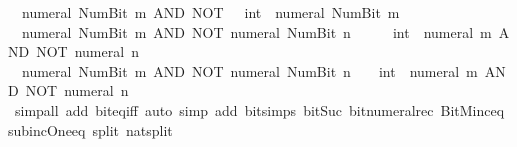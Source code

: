 \begin{isabellebody}
\ \ {\isacartoucheopen}numeral\ {\isacharparenleft}{\kern0pt}Num{\isachardot}{\kern0pt}Bit{}\ m{\isacharparenright}{\kern0pt}\ AND\ NOT\ {\isacharparenleft}{\kern0pt}{}\ {\isacharcolon}{\kern0pt}{\isacharcolon}{\kern0pt}\ int{\isacharparenright}{\kern0pt}\ {\isacharequal}{\kern0pt}\ numeral\ {\isacharparenleft}{\kern0pt}Num{\isachardot}{\kern0pt}Bit{}\ m{\isacharparenright}{\kern0pt}{\isacartoucheclose}\isanewline
\ \ {\isacartoucheopen}numeral\ {\isacharparenleft}{\kern0pt}Num{\isachardot}{\kern0pt}Bit{}\ m{\isacharparenright}{\kern0pt}\ AND\ NOT\ {\isacharparenleft}{\kern0pt}numeral\ {\isacharparenleft}{\kern0pt}Num{\isachardot}{\kern0pt}Bit{}\ n{\isacharparenright}{\kern0pt}{\isacharparenright}{\kern0pt}\ {\isacharequal}{\kern0pt}\ {}\ {\isacharplus}{\kern0pt}\ {\isacharparenleft}{\kern0pt}{}\ {\isacharcolon}{\kern0pt}{\isacharcolon}{\kern0pt}\ int{\isacharparenright}{\kern0pt}\ {\isacharasterisk}{\kern0pt}\ {\isacharparenleft}{\kern0pt}numeral\ m\ AND\ NOT\ {\isacharparenleft}{\kern0pt}numeral\ n{\isacharparenright}{\kern0pt}{\isacharparenright}{\kern0pt}{\isacartoucheclose}\isanewline
\ \ {\isacartoucheopen}numeral\ {\isacharparenleft}{\kern0pt}Num{\isachardot}{\kern0pt}Bit{}\ m{\isacharparenright}{\kern0pt}\ AND\ NOT\ {\isacharparenleft}{\kern0pt}numeral\ {\isacharparenleft}{\kern0pt}Num{\isachardot}{\kern0pt}Bit{}\ n{\isacharparenright}{\kern0pt}{\isacharparenright}{\kern0pt}\ {\isacharequal}{\kern0pt}\ {\isacharparenleft}{\kern0pt}{}\ {\isacharcolon}{\kern0pt}{\isacharcolon}{\kern0pt}\ int{\isacharparenright}{\kern0pt}\ {\isacharasterisk}{\kern0pt}\ {\isacharparenleft}{\kern0pt}numeral\ m\ AND\ NOT\ {\isacharparenleft}{\kern0pt}numeral\ n{\isacharparenright}{\kern0pt}{\isacharparenright}{\kern0pt}{\isacartoucheclose}\isanewline
%
\isadelimproof
\ \ %
\endisadelimproof
%
\isatagproof
{}\isamarkupfalse%
\ {\isacharparenleft}{\kern0pt}simp{\isacharunderscore}{\kern0pt}all\ add{\isacharcolon}{\kern0pt}\ bit{\isacharunderscore}{\kern0pt}eq{\isacharunderscore}{\kern0pt}iff{\isacharparenright}{\kern0pt}\ {\isacharparenleft}{\kern0pt}auto\ simp\ add{\isacharcolon}{\kern0pt}\ bit{\isacharunderscore}{\kern0pt}simps\ bit{\isacharunderscore}{\kern0pt}Suc\ bit{\isacharunderscore}{\kern0pt}numeral{\isacharunderscore}{\kern0pt}rec\ BitM{\isacharunderscore}{\kern0pt}inc{\isacharunderscore}{\kern0pt}eq\ sub{\isacharunderscore}{\kern0pt}inc{\isacharunderscore}{\kern0pt}One{\isacharunderscore}{\kern0pt}eq\ split{\isacharcolon}{\kern0pt}\ nat{\isachardot}{\kern0pt}split{\isacharparenright}{\kern0pt}%

\end{isabellebody}
